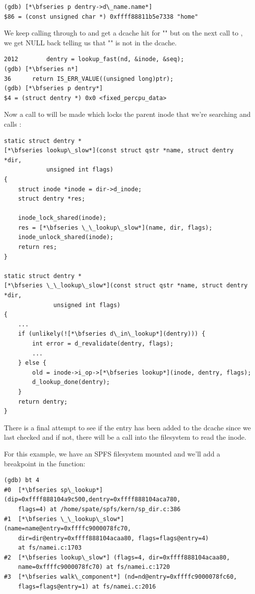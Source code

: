 \begin{lstlisting}
(gdb) [*\bfseries p dentry->d\_name.name*]
$86 = (const unsigned char *) 0xffff88811b5e7338 "home"
\end{lstlisting}

\noindent
We keep calling through to  and get a dcache hit for "" but on the next call to , we get NULL back telling us that "" is not in the dcache. 

\begin{lstlisting}
2012		dentry = lookup_fast(nd, &inode, &seq);
(gdb) [*\bfseries n*]
36		return IS_ERR_VALUE((unsigned long)ptr);
(gdb) [*\bfseries p dentry*]
$4 = (struct dentry *) 0x0 <fixed_percpu_data>
\end{lstlisting}

\noindent
Now a call to  will be made which locks the parent inode that we're searching and calls :

\begin{lstlisting}
static struct dentry *
[*\bfseries lookup\_slow*](const struct qstr *name, struct dentry *dir,
            unsigned int flags)
{
    struct inode *inode = dir->d_inode;
    struct dentry *res;
    
    inode_lock_shared(inode);
    res = [*\bfseries \_\_lookup\_slow*](name, dir, flags);
    inode_unlock_shared(inode);
    return res;
}

static struct dentry *
[*\bfseries \_\_lookup\_slow*](const struct qstr *name, struct dentry *dir,
              unsigned int flags)
{
    ...
    if (unlikely(![*\bfseries d\_in\_lookup*](dentry))) {
        int error = d_revalidate(dentry, flags);
        ...
    } else {
        old = inode->i_op->[*\bfseries lookup*](inode, dentry, flags);
        d_lookup_done(dentry);
    }
    return dentry;
}
\end{lstlisting}

\noindent
There is a final attempt to see if the entry has been added to the dcache since we last checked and if not, there will be a call into the filesystem to read the inode.

For this example, we have an SPFS filesystem mounted and we'll add a breakpoint in the  function:

\begin{lstlisting}
(gdb) bt 4
#0  [*\bfseries sp\_lookup*] (dip=0xffff888104a9c500,dentry=0xffff888104aca780,
    flags=4) at /home/spate/spfs/kern/sp_dir.c:386
#1  [*\bfseries \_\_lookup\_slow*] (name=name@entry=0xffffc9000078fc70, 
    dir=dir@entry=0xffff888104acaa80, flags=flags@entry=4) 
    at fs/namei.c:1703
#2  [*\bfseries lookup\_slow*] (flags=4, dir=0xffff888104acaa80, 
    name=0xffffc9000078fc70) at fs/namei.c:1720
#3  [*\bfseries walk\_component*] (nd=nd@entry=0xffffc9000078fc60, 
    flags=flags@entry=1) at fs/namei.c:2016
\end{lstlisting}

